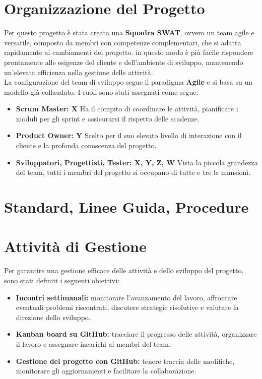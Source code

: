 \documentclass[a4paper,12pt]{article}
\begin{document}
\section{Organizzazione del Progetto} %
Per questo progetto è stata creata una \textbf{Squadra SWAT}, ovvero un team agile e versatile, composto da membri con competenze complementari, che si adatta 
rapidamente ai cambiamenti del progetto. in questo modo è più facile rispondere prontamente alle esigenze del cliente e dell’ambiente di sviluppo, 
mantenendo un'elevata efficienza nella gestione delle attività. \\
La configurazione del team di sviluppo segue il paradigma \textbf{Agile} e si basa su un modello già collaudato. I ruoli sono stati assegnati come segue: 
\begin{itemize}
    \item \textbf{Scrum Master: X} 
    Ha il compito di coordinare le attività, pianificare i moduli per gli sprint e assicurarsi il rispetto delle scadenze. 
    \item \textbf{Product Owner: Y} 
    Scelto per il suo elevato livello di interazione con il cliente e la profonda conoscenza del progetto.
    \item \textbf{Sviluppatori, Progettisti, Tester: X, Y, Z, W} 
    Vista la piccola grandezza del team, tutti i membri del progetto si occupano di tutte e tre le mansioni.
\end{itemize}

\section{Standard, Linee Guida, Procedure} %

\section{Attività di Gestione} %
Per garantire una gestione efficace delle attività e dello sviluppo del progetto, sono stati definiti i seguenti obiettivi:
\begin{itemize}
    \item \textbf{Incontri settimanali:} monitorare l’avanzamento del lavoro, affrontare eventuali problemi riscontrati, discutere strategie risolutive e valutare la direzione dello sviluppo.
    \item \textbf{Kanban board su GitHub:} tracciare il progresso delle attività, organizzare il lavoro e assegnare incarichi ai membri del team.
    \item \textbf{Gestione del progetto con GitHub:} tenere traccia delle modifiche, monitorare gli aggiornamenti e facilitare la collaborazione.
\end{itemize}
\end{document}
